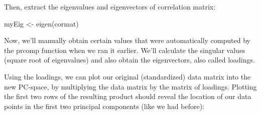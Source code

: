 \documentclass[
]{book}
\newenvironment{Shaded}{\begin{snugshade}}{\end{snugshade}}
\newcommand{\AttributeTok}[1]{\textcolor[rgb]{0.77,0.63,0.00}{#1}}
\newcommand{\FunctionTok}[1]{\textcolor[rgb]{0.00,0.00,0.00}{#1}}
\newcommand{\NormalTok}[1]{#1}
\newcommand{\OtherTok}[1]{\textcolor[rgb]{0.56,0.35,0.01}{#1}}
\newcommand{\SpecialCharTok}[1]{\textcolor[rgb]{0.00,0.00,0.00}{#1}}
\newcommand{\StringTok}[1]{\textcolor[rgb]{0.31,0.60,0.02}{#1}}
\begin{document}
Then, extract the eigenvalues and eigenvectors of correlation matrix:

\begin{Shaded}
\begin{Highlighting}[]
\NormalTok{myEig }\OtherTok{\textless{}{-}} \FunctionTok{eigen}\NormalTok{(cormat)}
\end{Highlighting}
\end{Shaded}

Now, we'll manually obtain certain values that were automatically computed by the prcomp function when we ran it earlier. We'll calculate the singular values (square root of eigenvalues) and also obtain the eigenvectors, also called loadings.

\begin{Shaded}
\end{Shaded}

Using the loadings, we can plot our original (standardized) data matrix into the new PC-space, by multiplying the data matrix by the matrix of loadings. Plotting the first two rows of the resulting product should reveal the location of our data points in the first two principal components (like we had before):

\begin{Shaded}
\end{Shaded}
\end{document}
